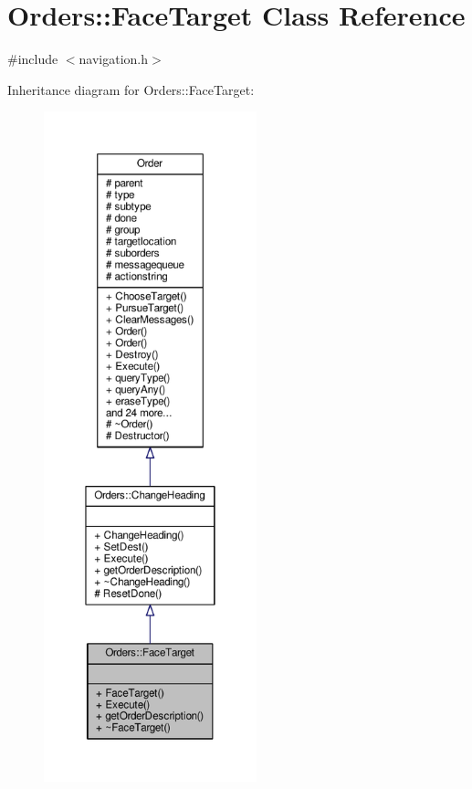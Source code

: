 \hypertarget{classOrders_1_1FaceTarget}{}\section{Orders\+:\+:Face\+Target Class Reference}
\label{classOrders_1_1FaceTarget}


{\ttfamily \#include $<$navigation.\+h$>$}



Inheritance diagram for Orders\+:\+:Face\+Target\+:
\nopagebreak
\begin{figure}[H]
\begin{center}
\leavevmode
\includegraphics[height=550pt]{d3/d77/classOrders_1_1FaceTarget__inherit__graph}
\end{center}
\end{figure}


